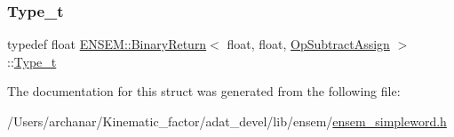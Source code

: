 \mbox{\label{structENSEM_1_1BinaryReturn_3_01float_00_01float_00_01OpSubtractAssign_01_4_a0b38c0b93f84d57852605cf3a65412e8}} 
\subsubsection{\texorpdfstring{Type\_t}{Type\_t}\hspace{0.1cm}{\footnotesize\ttfamily [2/2]}}
{\footnotesize\ttfamily typedef float \mbox{\hyperlink{structENSEM_1_1BinaryReturn}{E\+N\+S\+E\+M\+::\+Binary\+Return}}$<$ float, float, \mbox{\hyperlink{structENSEM_1_1OpSubtractAssign}{Op\+Subtract\+Assign}} $>$\+::\mbox{\hyperlink{structENSEM_1_1BinaryReturn_3_01float_00_01float_00_01OpSubtractAssign_01_4_a0b38c0b93f84d57852605cf3a65412e8}{Type\+\_\+t}}}



The documentation for this struct was generated from the following file\+:\begin{DoxyCompactItemize}
\item 
/\+Users/archanar/\+Kinematic\+\_\+factor/adat\+\_\+devel/lib/ensem/\mbox{\hyperlink{lib_2ensem_2ensem__simpleword_8h}{ensem\+\_\+simpleword.\+h}}\end{DoxyCompactItemize}
